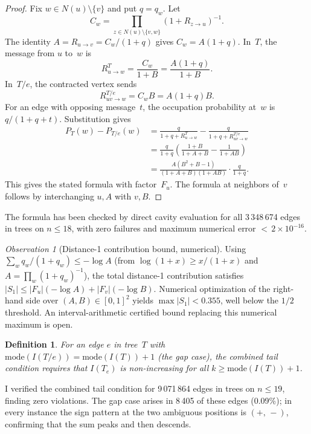 \documentclass[12pt,oneside]{article}
\newtheorem{definition}[theorem]{Definition}
\theoremstyle{remark}
\newtheorem{observation}[theorem]{Observation}
\begin{document}
\begin{proof}
Fix $w \in N(u)\setminus\{v\}$ and put $q=q_w$.
Let
\[
  C_w=\prod_{z\in N(u)\setminus\{v,w\}}(1+R_{z\to u})^{-1}.
\]
The identity $A=R_{u\to v}=C_w/(1+q)$ gives $C_w=A(1+q)$.
In~$T$, the message from $u$ to~$w$ is
\[
  R^T_{u\to w}=\frac{C_w}{1+B}=\frac{A(1+q)}{1+B}.
\]
In~$T/e$, the contracted vertex sends
\[
  R^{T/e}_{u\!v\to w}=C_wB=A(1+q)B.
\]
For an edge with opposing message~$t$, the occupation probability at~$w$ is $q/(1+q+t)$.
Substitution gives
\[
\begin{aligned}
  P_T(w)-P_{T/e}(w)
  &=
  \frac{q}{1+q+R^T_{u\to w}}
  -\frac{q}{1+q+R^{T/e}_{u\!v\to w}}  \\
  &=
  \frac{q}{1+q}\left(
    \frac{1+B}{1+A+B}-\frac{1}{1+AB}
  \right) \\
  &=
  \frac{A(B^2+B-1)}{(1+A+B)(1+AB)}
  \cdot \frac{q}{1+q}.
\end{aligned}
\]
This gives the stated formula with factor~$F_u$.
The formula at neighbors of~$v$ follows by interchanging $u,A$ with $v,B$.
\end{proof}

The formula has been checked by direct cavity evaluation for all 3\,348\,674 edges in trees on $n \le 18$, with zero failures and maximum numerical error ${<}\, 2 \times 10^{-16}$.

\begin{observation}[Distance-1 contribution bound, numerical]\label{obs:s1-bound}
Using $\sum_w q_w/(1+q_w) \le -\log A$ (from $\log(1+x) \ge x/(1+x)$ and $A = \prod_w (1+q_w)^{-1}$), the total distance-1 contribution satisfies $|S_1| \le |F_u|(-\log A) + |F_v|(-\log B)$. Numerical optimization of the right-hand side over $(A, B) \in [0,1]^2$ yields $\max |S_1| < 0.355$, well below the $1/2$ threshold. An interval-arithmetic certified bound replacing this numerical maximum is open.
\end{observation}

\begin{definition}\label{def:combined_tail}
  For an edge $e$ in tree~$T$ with $\mathrm{mode}(I(T/e)) = \mathrm{mode}(I(T)) + 1$ (the \emph{gap case}), the \emph{combined tail condition} requires that $I(T_e)$ is non-increasing for all $k \ge \mathrm{mode}(I(T)) + 1$.
\end{definition}

I verified the combined tail condition for 9\,071\,864 edges in trees on $n \le 19$, finding zero violations.
The gap case arises in 8\,405 of these edges (0.09\%); in every instance the sign pattern at the two ambiguous positions is $({+},\, {-})$, confirming that the sum peaks and then descends.
\end{document}
